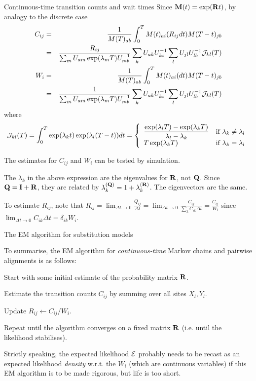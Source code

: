 \documentclass{beamer}
\begin{document}
\begin{frame}{Continuous-time transition counts and wait times}
\tiny
Since ${\bf M}(t) = \exp({\bf R}t)$, by analogy to the discrete case
\begin{eqnarray*}
C_{ij} & = & \frac{1}{M(T)_{ab}} \int_0^T M(t)_{ai} (R_{ij} dt) M(T-t)_{jb} \\
& = & \frac{R_{ij}}{\sum_m U_{am} \exp(\lambda_m T) U^{-1}_{mb}}
\sum_k U_{ak} U^{-1}_{ki} \sum_l U_{jl} U^{-1}_{lb} {\cal J}_{kl}(T) \\
W_i & = & \frac{1}{M(T)_{ab}} \int_0^T M(t)_{ai} (dt) M(T-t)_{jb} \\
& = & \frac{1}{\sum_m U_{am} \exp(\lambda_m T) U^{-1}_{mb}} \sum_k U_{ak} U^{-1}_{ki} \sum_l U_{jl} U^{-1}_{lb} {\cal J}_{kl}(T)
\end{eqnarray*}
where
\[
{\cal J}_{kl}(T) = \int_0^T \exp(\lambda_k t) \exp (\lambda_l(T-t)) dt = \left\{ \begin{array}{ll}
\displaystyle
\frac{\exp(\lambda_l T) - \exp(\lambda_k T)}{\lambda_l - \lambda_k} & \mbox{if $\lambda_k \neq \lambda_l$} \\
T \exp(\lambda_k T) & \mbox{if $\lambda_k = \lambda_l$}
\end{array} \right.
\]
\itemb
 \item The estimates for $C_{ij}$ and $W_i$ can be tested by simulation.
 \item The $\lambda_k$ in the above expression are the eigenvalues for ${\bf R}$, not ${\bf Q}$.
Since ${\bf Q} = {\bf I} + {\bf R}$, they are related by $\lambda_k^{({\bf Q})} = 1 + \lambda_k^{({\bf R})}$. The eigenvectors are the same.
 \item To estimate $R_{ij}$, note that $R_{ij} = \lim_{\Delta t \to 0} \frac{Q_{ij}}{\Delta t} = \lim_{\Delta t \to 0} \frac{C_{ij}}{\sum_k C_{ik} \Delta t} = \frac{C_{ij}}{W_i}$
since $\lim_{\Delta t \to 0} C_{ik} \Delta t = \delta_{ik} W_i$.
\iteme
\end{frame}

\begin{frame}{The EM algorithm for substitution models}
\itemb
 \item To summarise, the EM algorithm for {\em continuous-time} Markov chains and pairwise alignments is as follows:
  \enumb
  \item Start with some initial estimate of the probability matrix ${\bf R}$.
  \item Estimate the transition counts $C_{ij}$ by summing over all sites $X_l,Y_l$.
  \item Update $R_{ij} \leftarrow C_{ij} / W_i$.
  \item Repeat until the algorithm converges on a fixed matrix ${\bf R}$ (i.e. until the likelihood stabilises).
  \enume
 \item Strictly speaking, the expected likelihood ${\cal E}$ probably needs to be recast as an expected likelihood {\em density}
w.r.t. the $W_i$ (which are continuous variables) if this EM algorithm is to be made rigorous, but life is too short.
\iteme
\end{frame}
\end{document}
